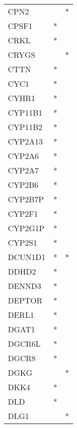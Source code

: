 \begin{longtable}{lcc}
CPN2             &                &          * \\
CPSF1            &              * &            \\
CRKL             &              * &            \\
CRYGS            &                &          * \\
CTTN             &              * &            \\
CYC1             &              * &            \\
CYHR1            &              * &            \\
CYP11B1          &              * &            \\
CYP11B2          &              * &            \\
CYP2A13          &              * &            \\
CYP2A6           &              * &            \\
CYP2A7           &              * &            \\
CYP2B6           &              * &            \\
CYP2B7P          &              * &            \\
CYP2F1           &              * &            \\
CYP2G1P          &              * &            \\
CYP2S1           &              * &            \\
DCUN1D1          &              * &          * \\
DDHD2            &              * &            \\
DENND3           &              * &            \\
DEPTOR           &              * &            \\
DERL1            &              * &            \\
DGAT1            &              * &            \\
DGCR6L           &              * &            \\
DGCR8            &              * &            \\
DGKG             &                &          * \\
DKK4             &              * &            \\
DLD              &              * &            \\
DLG1             &                &          * \\

\end{longtable}
